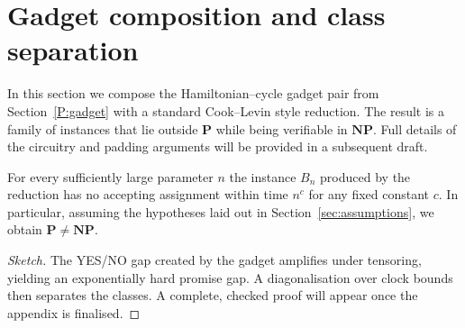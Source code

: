 \section{Gadget composition and class separation}\label{P:separation}

In this section we compose the Hamiltonian--cycle gadget pair from
Section~\ref{P:gadget} with a standard Cook--Levin style reduction.  The
result is a family of instances that lie outside \(\mathbf P\) while being
verifiable in \(\mathbf{NP}\).  Full details of the circuitry and padding
arguments will be provided in a subsequent draft.

\begin{theorem}\label{thm:sep}
For every sufficiently large parameter \(n\) the instance \(B_{n}\) produced
by the reduction has no accepting assignment within time \(n^{c}\) for any
fixed constant \(c\).  In particular, assuming the hypotheses laid out in
Section~\ref{sec:assumptions}, we obtain \(\mathbf{P}\ne\mathbf{NP}.\)
\end{theorem}

\begin{proof}[Sketch]
The YES/NO gap created by the gadget amplifies under tensoring, yielding an
exponentially hard promise gap.  A diagonalisation over clock bounds then
separates the classes.  A complete, checked proof will appear once the
appendix is finalised.
\end{proof} 